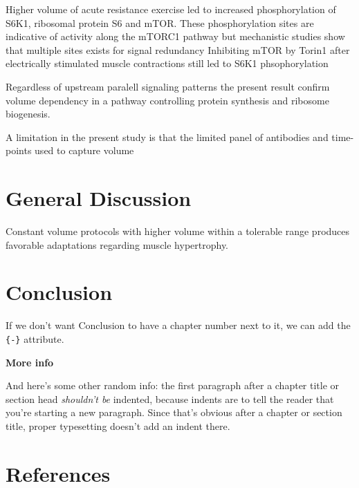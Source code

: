 \documentclass[twoside,10pt]{gihclass} %
\begin{document}
Higher volume of acute resistance exercise led to increased phosphorylation of S6K1, ribosomal protein S6 and mTOR. These phosphorylation sites are indicative of activity along the mTORC1 pathway but mechanistic studies show that multiple sites exists for signal redundancy
Inhibiting mTOR by Torin1 after electrically stimulated muscle contractions still led to S6K1 phsophorylation

Regardless of upstream paralell signaling patterns the present result confirm volume dependency in a pathway controlling protein synthesis and ribosome biogenesis.

A limitation in the present study is that the limited panel of antibodies and time-points used to capture volume

\hypertarget{general-discussion}{%
\chapter{General Discussion}\label{general-discussion}}

Constant volume protocols with higher volume within a tolerable range produces favorable adaptations regarding muscle hypertrophy.

\hypertarget{conclusion}{%
\chapter*{Conclusion}\label{conclusion}}

If we don't want Conclusion to have a chapter number next to it, we can add the \texttt{\{-\}} attribute.

\textbf{More info}

And here's some other random info: the first paragraph after a chapter title or section head \emph{shouldn't be} indented, because indents are to tell the reader that you're starting a new paragraph. Since that's obvious after a chapter or section title, proper typesetting doesn't add an indent there.

\backmatter

\hypertarget{references}{%
\chapter*{References}\label{references}}


\noindent
\end{document}
